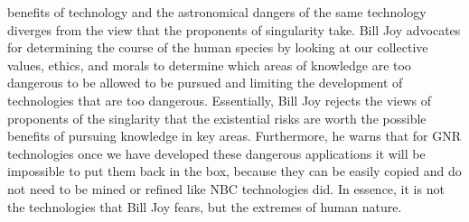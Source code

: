 benefits of technology and the astronomical dangers of the same technology diverges from the view that the proponents of singularity take. Bill Joy advocates for determining the course of the human species by looking at our collective values, ethics, and morals to determine which areas of knowledge are too dangerous to be allowed to be pursued and limiting the development of technologies that are too dangerous. Essentially, Bill Joy rejects the views of proponents of the singlarity that the existential risks are worth the possible benefits of pursuing knowledge in key areas. Furthermore, he warns that for GNR technologies once we have developed these dangerous applications it will be impossible to put them back in the box, because they can be easily copied and do not need to be mined or refined like NBC technologies did. In essence, it is not the 
technologies that Bill Joy fears, but the extremes of human nature. 
\label{sec:-bill}

